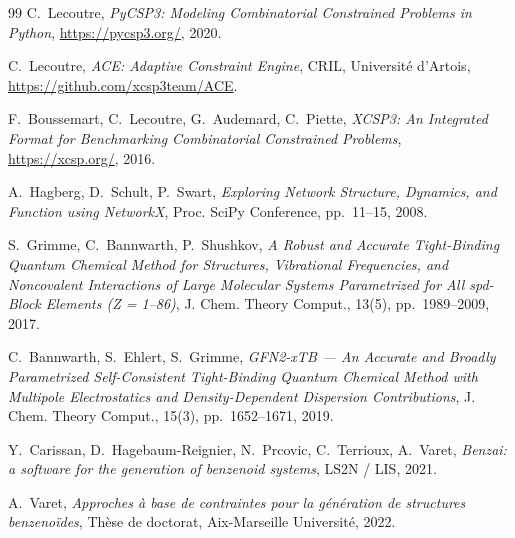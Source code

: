 \documentclass[12pt,a4paper]{article}
\theoremstyle{definition}
\begin{document}
\begin{thebibliography}{99}
    C.~Lecoutre, \textit{PyCSP3: Modeling Combinatorial Constrained Problems in Python},
    \url{https://pycsp3.org/}, 2020.

    C.~Lecoutre, \textit{ACE: Adaptive Constraint Engine},
    CRIL, Université d'Artois,
    \url{https://github.com/xcsp3team/ACE}.

    F.~Boussemart, C.~Lecoutre, G.~Audemard, C.~Piette,
    \textit{XCSP3: An Integrated Format for Benchmarking Combinatorial Constrained Problems},
    \url{https://xcsp.org/}, 2016.

    A.~Hagberg, D.~Schult, P.~Swart,
    \textit{Exploring Network Structure, Dynamics, and Function using NetworkX},
    Proc. SciPy Conference, pp.~11--15, 2008.

    S.~Grimme, C.~Bannwarth, P.~Shushkov,
    \textit{A Robust and Accurate Tight-Binding Quantum Chemical Method for Structures,
    Vibrational Frequencies, and Noncovalent Interactions of Large Molecular Systems
    Parametrized for All spd-Block Elements (Z = 1--86)},
    J. Chem. Theory Comput., 13(5), pp.~1989--2009, 2017.

    C.~Bannwarth, S.~Ehlert, S.~Grimme,
    \textit{GFN2-xTB — An Accurate and Broadly Parametrized Self-Consistent Tight-Binding
    Quantum Chemical Method with Multipole Electrostatics and Density-Dependent Dispersion
    Contributions},
    J. Chem. Theory Comput., 15(3), pp.~1652--1671, 2019.

    Y.~Carissan, D.~Hagebaum-Reignier, N.~Prcovic, C.~Terrioux, A.~Varet,
    \textit{Benzai: a software for the generation of benzenoid systems},
    LS2N / LIS, 2021.

    A.~Varet,
    \textit{Approches à base de contraintes pour la génération de structures benzenoïdes},
    Thèse de doctorat, Aix-Marseille Université, 2022.
\end{thebibliography}
\end{document}
